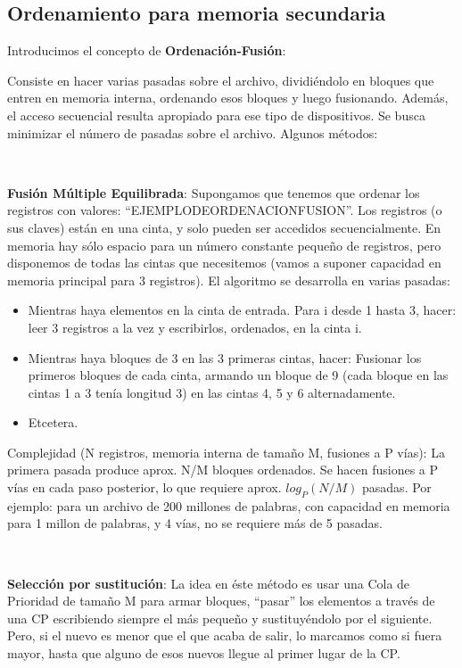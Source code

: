 \subsection{Ordenamiento para memoria secundaria}

Introducimos el concepto de \textbf{Ordenaci\'on-Fusi\'on}:

Consiste en hacer varias pasadas sobre el archivo, dividi\'endolo en bloques que entren en memoria interna, ordenando esos bloques y luego fusionando. Adem\'as, el acceso secuencial resulta apropiado para ese tipo de dispositivos. Se busca minimizar el n\'umero de pasadas sobre el archivo.
Algunos m\'etodos:

~

\textbf{Fusi\'on M\'ultiple Equilibrada}: Supongamos que tenemos que ordenar los registros con valores: ``EJEMPLODEORDENACIONFUSION''.
Los registros (o sus claves) est\'an en una cinta, y solo pueden ser accedidos secuencialmente. En memoria hay s\'olo espacio para un n\'umero constante pequeño de registros, pero disponemos de todas las cintas que necesitemos (vamos a suponer capacidad en memoria principal para 3 registros).
El algoritmo se desarrolla en varias pasadas:
 \begin{itemize}
  \item Mientras haya elementos en la cinta de entrada. Para i desde 1 hasta 3, hacer: leer 3 registros a la vez y escribirlos, ordenados, en la cinta i.
  \item Mientras haya bloques de 3 en las 3 primeras cintas, hacer: Fusionar los primeros bloques de cada cinta, armando un bloque de 9 (cada bloque en las cintas 1 a 3 ten\'ia longitud 3) en las cintas 4, 5 y 6 alternadamente.
  \item Etcetera.
 \end{itemize}

 Complejidad (N registros, memoria interna de tamaño M, fusiones a P v\'ias): La primera pasada produce aprox. N/M bloques ordenados. Se hacen fusiones a P v\'ias en cada paso posterior, lo que requiere aprox. $log_P(N/M)$ pasadas.
 Por ejemplo: para un archivo de 200 millones de palabras, con capacidad en memoria para 1 millon de palabras, y 4 v\'ias, no se requiere m\'as de 5 pasadas.

~

\textbf{Selecci\'on por sustituci\'on}: La idea en \'este m\'etodo es usar una Cola de Prioridad de tamaño M para armar bloques, ``pasar'' los elementos a trav\'es de una CP escribiendo siempre el m\'as pequeño y sustituy\'endolo por el siguiente. Pero, si el nuevo es menor que el que acaba de salir, lo marcamos como si fuera mayor, hasta que alguno de esos nuevos llegue al primer lugar de la CP.

